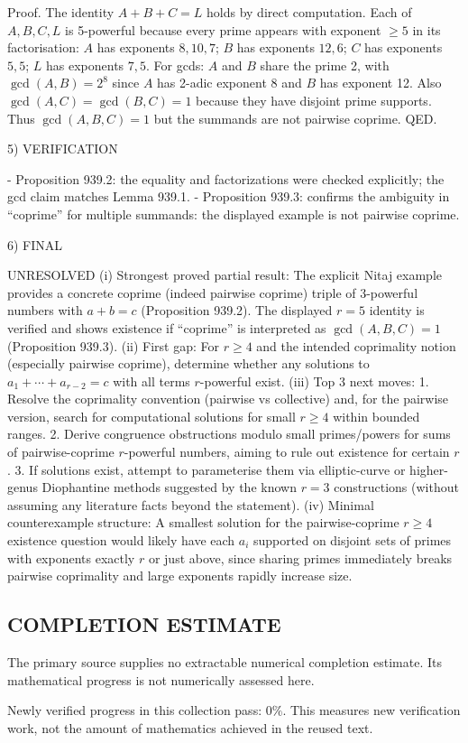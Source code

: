 Proof.
The identity \(A+B+C=L\) holds by direct computation.
Each of \(A,B,C,L\) is 5-powerful because every prime appears with exponent \(\ge 5\) in its factorisation:
\(A\) has exponents \(8,10,7\); \(B\) has exponents \(12,6\); \(C\) has exponents \(5,5\); \(L\) has exponents \(7,5\).
For gcds: \(A\) and \(B\) share the prime 2, with \(\gcd(A,B)=2^8\) since \(A\) has 2-adic exponent 8 and \(B\) has exponent 12. Also \(\gcd(A,C)=\gcd(B,C)=1\) because they have disjoint prime supports. Thus \(\gcd(A,B,C)=1\) but the summands are not pairwise coprime. QED.

5) VERIFICATION

- Proposition 939.2: the equality and factorizations were checked explicitly; the gcd claim matches Lemma 939.1.
- Proposition 939.3: confirms the ambiguity in ``coprime'' for multiple summands: the displayed example is not pairwise coprime.

6) FINAL

UNRESOLVED
(i) Strongest proved partial result: The explicit Nitaj example provides a concrete coprime (indeed pairwise coprime) triple of 3-powerful numbers with \(a+b=c\) (Proposition 939.2). The displayed \(r=5\) identity is verified and shows existence if ``coprime'' is interpreted as \(\gcd(A,B,C)=1\) (Proposition 939.3).
(ii) First gap: For \(r\ge 4\) and the intended coprimality notion (especially pairwise coprime), determine whether any solutions to \(a_1+\cdots+a_{r-2}=c\) with all terms \(r\)-powerful exist.
(iii) Top 3 next moves:
  1. Resolve the coprimality convention (pairwise vs collective) and, for the pairwise version, search for computational solutions for small \(r\ge4\) within bounded ranges.
  2. Derive congruence obstructions modulo small primes/powers for sums of pairwise-coprime \(r\)-powerful numbers, aiming to rule out existence for certain \(r\).
  3. If solutions exist, attempt to parameterise them via elliptic-curve or higher-genus Diophantine methods suggested by the known \(r=3\) constructions (without assuming any literature facts beyond the statement).
(iv) Minimal counterexample structure: A smallest solution for the pairwise-coprime \(r\ge4\) existence question would likely have each \(a_i\) supported on disjoint sets of primes with exponents exactly \(r\) or just above, since sharing primes immediately breaks pairwise coprimality and large exponents rapidly increase size.




\subsection*{COMPLETION ESTIMATE}
The primary source supplies no extractable numerical completion estimate. Its mathematical progress is not numerically assessed here.

Newly verified progress in this collection pass: $0\%$. This measures new verification work, not the amount of mathematics achieved in the reused text.
